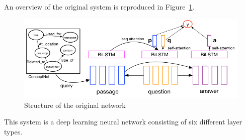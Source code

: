 An overview of the original system is reproduced in Figure~\ref{fig:dnn}.
\begin{figure}[h]
	\centering
	\includegraphics[scale=0.5]{TriAN.jpg}
	\caption{Structure of the original network \cite[p.2]{Wang:2018}}
	\label{fig:dnn}
\end{figure}
This system is a deep learning neural network consisting of six different layer types.

